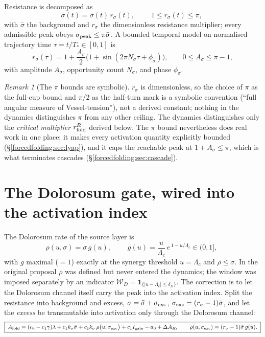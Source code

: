 \documentclass[11pt,a4paper,oneside]{book}
\newcommand{\Igate}{I_{\rm gate}}
\newcommand{\Lc}{\Lambda_c}
\newcommand{\Af}{A_{\rm fold}}
\newcommand{\rs}{r_\sigma}
\newcommand{\rR}{r^{R}_{\rm fold}}
\theoremstyle{plain}
\theoremstyle{definition}
\theoremstyle{remark}
\newtheorem*{remark}{Remark}
\begin{document}
Resistance is decomposed as
\begin{equation}
\sigma(t)=\bar\sigma(t)\,\rs(t),
\qquad
\boxed{\;1\le\rs(t)\le\pi,\;}
\end{equation}
with $\bar\sigma$ the background and $\rs$ the dimensionless resistance multiplier; every admissible
peak obeys $\sigma_{\rm peak}\le\pi\bar\sigma$. A bounded temporal model on normalised trajectory time
$\tau=t/T_\ast\in[0,1]$ is
\begin{equation}
\rs(\tau)=1+\frac{A_\sigma}{2}\bigl(1+\sin(2\pi N_\sigma\tau+\phi_\sigma)\bigr),
\qquad 0\le A_\sigma\le\pi-1,
\end{equation}
with amplitude $A_\sigma$, opportunity count $N_\sigma$, and phase $\phi_\sigma$.

\begin{remark}[The $\pi$ bounds are symbolic]
$\rs$ is dimensionless, so the choice of $\pi$ as the full-cup bound and $\pi/2$ as the half-turn mark is
a symbolic convention (``full angular measure of Vessel-tension''), not a derived constant; nothing in
the dynamics distinguishes $\pi$ from any other ceiling. The dynamics distinguishes only the
\emph{critical multiplier} $\rR$ derived below. The $\pi$ bound nevertheless does real work in one
place: it makes every activation quantity explicitly bounded (\S\ref{forcedfolding:sec:lyap}), and it caps the
reachable peak at $1+A_\sigma\le\pi$, which is what terminates cascades (\S\ref{forcedfolding:sec:cascade}).
\end{remark}

\section{The Dolorosum gate, wired into the activation index}\label{forcedfolding:sec:gate}

The Dolorosum rate of the source layer is
\begin{equation}
\rho(u,\sigma)=\sigma\,g(u),
\qquad
\boxed{\;g(u)=\frac{u}{\Lc}\,e^{\,1-u/\Lc}\in(0,1],\;}
\end{equation}
with $g$ maximal ($=1$) exactly at the synergy threshold $u=\Lc$ and $\rho\le\sigma$. In the original
proposal $\rho$ was defined but never entered the dynamics; the window was imposed separately by an
indicator $\mathcal W_D=\mathbf 1_{\{|u-\Lc|\le\delta_D\}}$. The correction is to let the Dolorosum
channel itself carry the peak into the activation index. Split the resistance into background and excess,
$\sigma=\bar\sigma+\sigma_{\rm exc}$, $\sigma_{\rm exc}=(\rs-1)\bar\sigma$, and let the \emph{excess} be
transmutable into activation only through the Dolorosum channel:
\begin{equation}\label{forcedfolding:eq:Awired}
\boxed{\;
\Af=(c_0-c_1\gamma)\lambda+c_1k_\sigma\bar\sigma
+c_1k_\sigma\,\rho\bigl(u,\sigma_{\rm exc}\bigr)
+c_1\Igate-a_0+\Delta A_R,
\qquad
\rho(u,\sigma_{\rm exc})=(\rs-1)\bar\sigma\,g(u).\;}
\end{equation}
\end{document}
